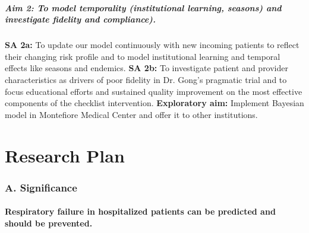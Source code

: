 \documentclass[11pt,notitlepage]{article}
\begin{document}
\subsubsection*{Aim 2: To model temporality (institutional learning, seasons) and investigate fidelity and compliance).}
\textbf{SA 2a:} To update our model continuously with new incoming patients to reflect their changing risk profile and to model institutional learning and temporal effects like seasons and endemics. 
\newline \textbf{SA 2b:} To investigate patient and provider characteristics as drivers of poor fidelity in Dr. Gong's pragmatic trial and to focus educational efforts and sustained quality improvement on the most effective components of the checklist intervention.
\newline \textbf{Exploratory aim:} Implement Bayesian model in Montefiore Medical Center and offer it to other institutions.
\newpage
\part*{Research Plan}

\section*{A. Significance}

\subsection*{Respiratory failure in hospitalized patients can be predicted and should be prevented.} 
\end{document}
